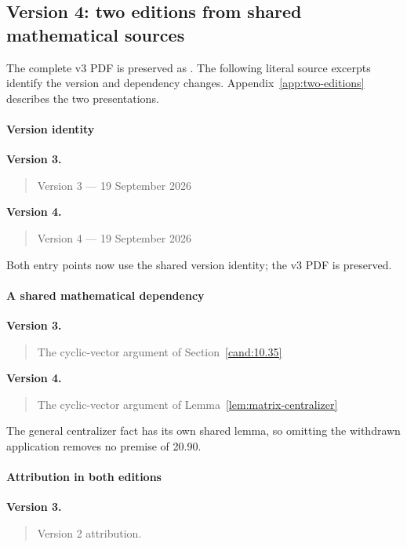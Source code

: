 \subsection{Version 4: two editions from shared mathematical sources}
The complete v3 PDF is preserved as
.
The following literal source excerpts identify the version and dependency
changes. Appendix~\ref{app:two-editions} describes the two presentations.

\paragraph{Version identity}

\noindent\textbf{Version 3.}\begin{quote}\small
Version 3 --- 19 September 2026
\end{quote}

\noindent\textbf{Version 4.}\begin{quote}\small
Version 4 --- 19 September 2026
\end{quote}

Both entry points now use the shared version identity; the v3 PDF is preserved.

\paragraph{A shared mathematical dependency}

\noindent\textbf{Version 3.}\begin{quote}\small
The cyclic-vector argument of Section~\ref{cand:10.35}
\end{quote}

\noindent\textbf{Version 4.}\begin{quote}\small
The cyclic-vector argument of Lemma~\ref{lem:matrix-centralizer}
\end{quote}

The general centralizer fact has its own shared lemma, so omitting the withdrawn application removes no premise of 20.90.

\paragraph{Attribution in both editions}

\noindent\textbf{Version 3.}\begin{quote}\small
Version 2 attribution.
\end{quote}

